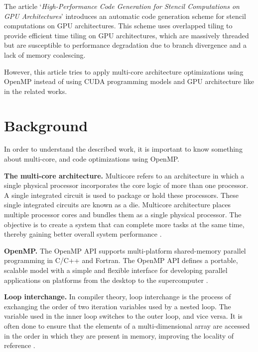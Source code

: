 \documentclass[conference]{IEEEtran}
\newcommand{\mypar}[1]{{\bf #1.}}
\begin{document}
The article `\textit{High-Performance Code Generation for Stencil Computations on GPU Architectures}' \cite{holewinski-pouchet-sadayappan} introduces an automatic code generation scheme for stencil computations on GPU architectures. This scheme uses overlapped tiling to provide efficient time tiling on GPU architectures, which are massively threaded but are susceptible to performance degradation due to branch divergence and a lack of memory coalescing. 

However, this article tries to apply multi-core architecture optimizations using OpenMP instead of using CUDA programming models and GPU architecture like in the related works.

\section{Background}\label{sec:background}

In order to understand the described work, it is important to know something about multi-core, and code optimizations using OpenMP.

\mypar{The multi-core architecture}
Multicore refers to an architecture in which a single physical processor incorporates the core logic of more than one processor. A single integrated circuit is used to package or hold these processors. These single integrated circuits are known as a die. Multicore architecture places multiple processor cores and bundles them as a single physical processor. The objective is to create a system that can complete more tasks at the same time, thereby gaining better overall system performance \cite{techopedia}.

\mypar{OpenMP}
The OpenMP API supports multi-platform shared-memory parallel programming in C/C++ and Fortran. The OpenMP API defines a portable, scalable model with a simple and flexible interface for developing parallel applications on platforms from the desktop to the supercomputer \cite{openmp}.

\mypar{Loop interchange}
In compiler theory, loop interchange is the process of exchanging the order of two iteration variables used by a nested loop. The variable used in the inner loop switches to the outer loop, and vice versa. It is often done to ensure that the elements of a multi-dimensional array are accessed in the order in which they are present in memory, improving the locality of reference \cite{loop-interchange}.
\end{document}
